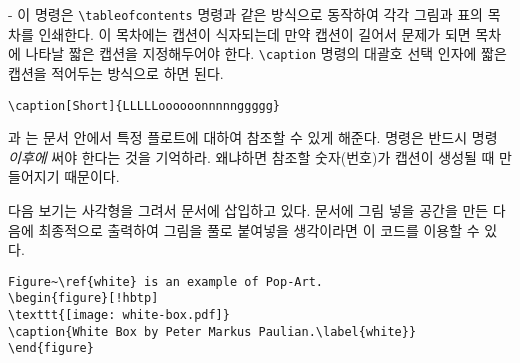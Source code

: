 \begin{adjustwidth}{0pt}{-\margheadwidth}
\noindent 이 명령은 \verb|\tableofcontents| 명령과 같은 방식으로 동작하여
각각 그림과 표의 목차를 인쇄한다.
이 목차에는 캡션이 식자되는데 만약 캡션이 길어서 문제가 되면 목차에 나타날 
짧은 캡션을 지정해두어야 한다.
\verb|\caption| 명령의 대괄호 선택 인자에 짧은 캡션을 적어두는 방식으로 하면 된다.
\begin{code}
\verb|\caption[Short]{LLLLLoooooonnnnnggggg}|
\end{code}

과 는 문서 안에서 특정 플로트에 대하여 참조할 수 있게 해준다.
 명령은 반드시  명령 \emph{이후에} 써야 한다는 것을 기억하라.
왜냐하면 참조할 숫자(번호)가 캡션이 생성될 때 만들어지기 때문이다.

다음 보기는 사각형을 그려서 문서에 삽입하고 있다.
문서에 그림 넣을 공간을 만든 다음에 최종적으로 출력하여 그림을 풀로 붙여넣을 
생각이라면 이 코드를 이용할 수 있다.

\begin{code}
\begin{verbatim}
Figure~\ref{white} is an example of Pop-Art.
\begin{figure}[!hbtp]
\texttt{[image: white-box.pdf]}
\caption{White Box by Peter Markus Paulian.\label{white}}
\end{figure}
\end{verbatim}
\end{code}


\end{adjustwidth}
